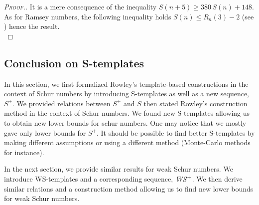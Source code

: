 \begin{proof}[\textsc{Proof.}]
It is a mere consequence of the inequality \( S(n+5) \geqslant 380 \, S(n) + 148\). As for Ramsey
numbers, the following inequality holds \(S(n) \leqslant R_n(3) - 2\) (see \cite{AbbottHanson}) hence the result. \\
\end{proof}


\subsection{Conclusion on S-templates}

In this section, we first formalized Rowley's template-based constructions \cite{RowleyRamsey} in the context of Schur numbers 
by introducing S-templates as well as a new sequence, \(S^+\). We provided relations between \(S^+\) and \(S\) then 
stated Rowley's construction method in the context of Schur numbers. We found new S-templates allowing us to obtain 
new lower bounds for schur numbers. One may notice that we mostly gave only lower bounds for \(S^+\). It should be possible to 
find better S-templates by making different assumptions or using a different method (Monte-Carlo methods for instance).

\par
In the next section, we provide similar results for weak Schur numbers. We introduce WS-templates and a corresponding sequence, 
\(\mathit{WS}^+\). We then derive similar relations and a construction method allowing us to find new lower bounds for weak Schur numbers.